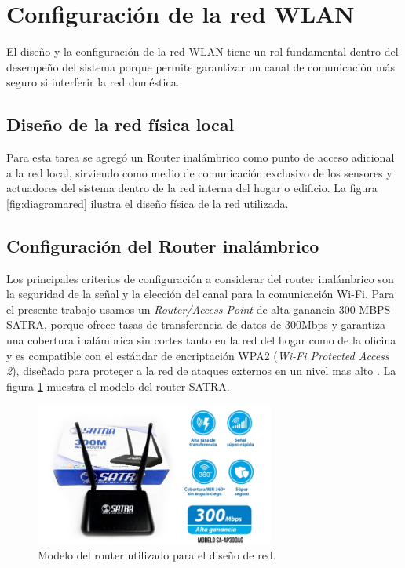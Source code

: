 \section{Configuración de la red WLAN}

El diseño y la configuración de la red WLAN tiene un rol fundamental dentro del desempeño del sistema porque permite garantizar un canal de comunicación más seguro si interferir la red doméstica.

\subsection{Diseño de la red física local}

Para esta tarea se agregó un Router inalámbrico como punto de acceso adicional a la red local, sirviendo como medio de comunicación exclusivo de los sensores y actuadores del sistema dentro de la red interna del hogar o edificio. La figura \ref{fig:diagramared} ilustra el diseño física de la red utilizada.


\subsection{Configuración del Router inalámbrico}
Los principales criterios de configuración a considerar del router inalámbrico son la seguridad de la señal y la elección del canal para la comunicación Wi-Fi. Para el presente trabajo usamos un \emph{Router/Access Point} de alta ganancia 300 MBPS SATRA, porque ofrece tasas de transferencia de datos de 300Mbps y garantiza una cobertura inalámbrica sin cortes tanto en la red del hogar como de la oficina y es compatible con el estándar de encriptación WPA2 (\emph{Wi-Fi Protected Access 2}), diseñado para proteger a la red de ataques externos en un nivel mas alto \citep{WEBSITE:25}. La figura \ref{fig:router} muestra el modelo del router SATRA.

\begin{figure}[htpb]
\centering 
\includegraphics[width=0.7\textwidth]{./Figures/router.jpg}
\caption{Modelo del router utilizado para el diseño de red.}
\label{fig:router}
\end{figure}

